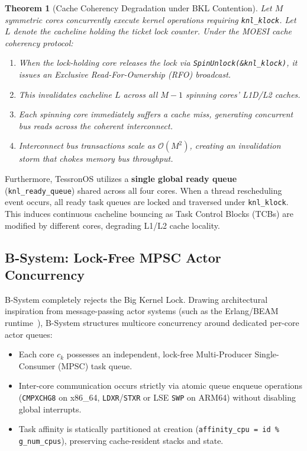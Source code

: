 \documentclass[10pt,journal,compsoc,twocolumn]{article}
\newtheorem{theorem}{Theorem}
\begin{document}
\begin{theorem}[Cache Coherency Degradation under BKL Contention]
\label{thm:bkl_moesi}
Let $M$ symmetric cores concurrently execute kernel operations requiring \texttt{knl\_klock}. Let $L$ denote the cacheline holding the ticket lock counter. Under the MOESI cache coherency protocol:
\begin{enumerate}[leftmargin=*]
    \item When the lock-holding core releases the lock via \texttt{SpinUnlock(\&knl\_klock)}, it issues an Exclusive Read-For-Ownership (RFO) broadcast.
    \item This invalidates cacheline $L$ across all $M-1$ spinning cores' L1D/L2 caches.
    \item Each spinning core immediately suffers a cache miss, generating concurrent bus reads across the coherent interconnect.
    \item Interconnect bus transactions scale as $\mathcal{O}(M^2)$, creating an invalidation storm that chokes memory bus throughput.
\end{enumerate}
\end{theorem}

Furthermore, TessronOS utilizes a \textbf{single global ready queue} (\texttt{knl\_ready\_queue}) shared across all four cores. When a thread rescheduling event occurs, all ready task queues are locked and traversed under \texttt{knl\_klock}. This induces continuous cacheline bouncing as Task Control Blocks (TCBs) are modified by different cores, degrading L1/L2 cache locality.

\subsection{B-System: Lock-Free MPSC Actor Concurrency}
B-System completely rejects the Big Kernel Lock. Drawing architectural inspiration from message-passing actor systems (such as the Erlang/BEAM runtime~\cite{armstrong2003erlang}), B-System structures multicore concurrency around dedicated per-core actor queues:
\begin{itemize}[leftmargin=*]
    \item Each core $c_k$ possesses an independent, lock-free Multi-Producer Single-Consumer (MPSC) task queue.
    \item Inter-core communication occurs strictly via atomic queue enqueue operations (\texttt{CMPXCHG8} on x86\_64, \texttt{LDXR}/\texttt{STXR} or LSE \texttt{SWP} on ARM64) without disabling global interrupts.
    \item Task affinity is statically partitioned at creation (\texttt{affinity\_cpu = id \% g\_num\_cpus}), preserving cache-resident stacks and state.
\end{itemize}
\end{document}
